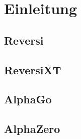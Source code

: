 \section{Einleitung}
\subsection{Reversi}
\subsection{ ReversiXT}
\subsection{AlphaGo}
\subsection{AlphaZero}